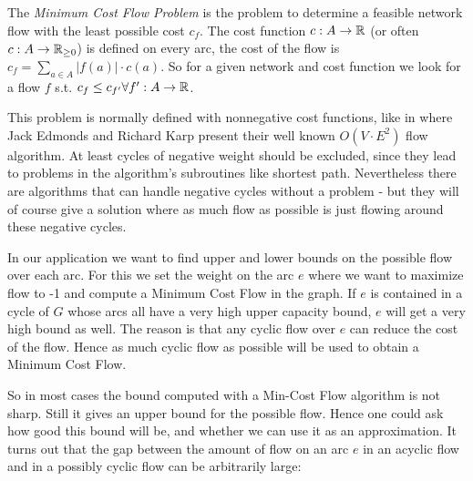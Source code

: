 \begin{definition}\label{def:mincostflow}
 The \textit{Minimum Cost Flow Problem} is the problem to determine a feasible network flow with the least possible 
cost $c_f$. The cost function $c:A\to \mathbb{R}$ (or often $c:A\to \mathbb{R}_{\ge 0}$) is defined on every arc, the cost of the flow 
is $c_f = \sum_{a\in A}|f(a)|\cdot c(a)$. So for a given network and cost function we look for a flow $f$ s.t. $c_f\le 
c_{f'}\forall f':A\to \mathbb{R}$.
\end{definition}

This problem is normally defined with nonnegative cost functions, like in \cite{EdmondsKarp1972} where 
Jack Edmonds and Richard Karp present their well known $O(V\cdot E^2)$ flow algorithm. At least cycles of negative 
weight should be excluded, since they lead to problems in the algorithm's subroutines like shortest path. Nevertheless 
there are algorithms that can handle negative cycles without a problem - but they will of course give a solution 
where as much flow as possible is just flowing around these negative cycles. 

In our application we want to find upper and lower bounds on the possible flow over each arc. For this we set the 
weight on the arc $e$ where we want to maximize flow to -1 and compute a Minimum Cost Flow in the graph. If $e$ is 
contained in a cycle of $G$ whose arcs all have a very high upper capacity bound, $e$ will get a very high bound as 
well. The reason is that any cyclic flow over $e$ can reduce the cost of the flow. Hence as much cyclic flow as 
possible will be used to obtain a Minimum Cost Flow. 

So in most cases the bound computed with a Min-Cost Flow algorithm is not sharp. Still it gives an upper bound for the 
possible flow. Hence one could ask how good this bound will be, and whether we can use it as an approximation. It turns 
out that the gap between the amount of flow on an arc $e$ in an acyclic flow and in a possibly cyclic flow can be 
arbitrarily large:

